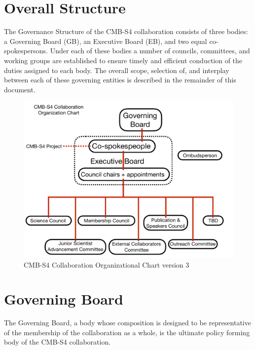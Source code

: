 \documentclass[12pt]{article}
\newcommand{\Comment}[1]{\textcolor{Blue}{(Comment: #1)}}
\begin{document}
\section{Overall Structure}
The Governance Structure of the CMB-S4 collaboration consists of three bodies: a Governing Board (GB), an Executive Board (EB), and two equal co-spokespersons. 
Under each of these bodies a number of councils, committees, and working groups are established to ensure timely and efficient conduction of the duties assigned to each body. The overall scope, selection of, and interplay between each of these governing entities is described in the remainder of this document. 


\begin{figure}[h!]
\begin{center}
\includegraphics[width=6.5in]{CMB-S4_Org_chart_+_details_v3.pdf}
\end{center}
\caption{CMB-S4 Collaboration Organizational Chart version 3}
\label{fig:org_chart}
\end{figure}

\section{Governing Board}

The Governing Board, a body whose composition is designed to be representative of the membership of the collaboration as a whole, is the ultimate policy forming body of the CMB-S4 collaboration. 
\end{document}
